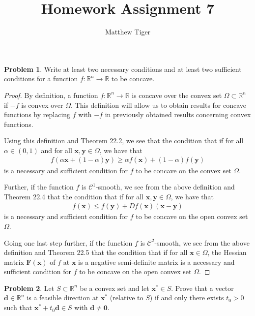 \documentclass[12pt]{article}
\title{Homework Assignment 7}
\author{Matthew Tiger}
\theoremstyle{definition}
\newtheorem{problem}{Problem}
\newcommand{\vc}[1]{\boldsymbol{#1}}
\begin{document}
\maketitle


\begin{problem}
  Write at least two necessary conditions and at least two sufficient conditions for
  a function $f: \mathbb{R}^n \to \mathbb{R}$ to be concave.
\end{problem}

\begin{proof}
  By definition, a function $f: \mathbb{R}^n \to \mathbb{R}$ is concave over the convex
  set $\Omega \subset \mathbb{R}^n$ if $-f$ is convex over $\Omega$. This
  definition will allow us to obtain results for concave functions by replacing
  $f$ with $-f$ in previously obtained results concerning convex functions.

  Using this definition and Theorem 22.2, we see that the condition that if for all
  $\alpha \in (0, 1)$ and for all $\vc{x}, \vc{y} \in \Omega$, we have that
  \begin{align*}
    f(\alpha\vc{x} + (1-\alpha)\vc{y}) \geq \alpha f(\vc{x}) + (1-\alpha)f(\vc{y})
  \end{align*}
  is a necessary and sufficient condition for $f$ to be concave on the convex set $\Omega$.

  Further, if the function $f$ is $\mathcal{C}^1$-smooth, we see from the above definition and Theorem 22.4 that the condition that
  if for all $\vc{x}, \vc{y} \in \Omega$, we have that
  \begin{align*}
    f(\vc{x}) \leq f(\vc{y}) + D f(\vc{x}) (\vc{x} - \vc{y})
  \end{align*}
  is a necessary and sufficient condition for $f$ to be concave on the open convex set $\Omega$.

  Going one last step further, if the function $f$ is $\mathcal{C}^2$-smooth, we see from the above definition and Theorem
  22.5 that the condition that if for all $\vc{x}\in\Omega$, the Hessian matrix $\vc{F}(\vc{x})$ of $f$ at $\vc{x}$ is a negative semi-definite matrix
  is a necessary and sufficient condition for $f$ to be concave on the open convex set $\Omega$.
\end{proof}
\newpage


\begin{problem}
  Let $S \subset \mathbb{R}^n$ be a convex set and let $\vc{x}^* \in S$. Prove that a vector
  $\vc{d} \in \mathbb{R}^n$ is a feasible direction at $\vc{x}^*$ (relative to $S$) if and only
  there exists $t_0 > 0$ such that $\vc{x}^* + t_0 \vc{d} \in S$ with $\vc{d} \neq \vc{0}$.
\end{problem}
\end{document}
